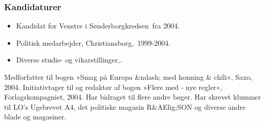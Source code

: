 \documentclass[11pt, a4paper]{awesome-cv}
\begin{document}
\begin{cvletter}
\subsubsection*{Kandidaturer}
\begin{itemize}
\item Kandidat for Venstre i Sønderborgkredsen fra 2004.
\end{itemize}
\begin{itemize}
\item Politisk medarbejder, Christiansborg, 1999-2004.
\item Diverse studie- og vikarstillinger,.
\end{itemize}
Medforfatter til bogen »Smag på Europa &ndash; med honning \& chili«, Saxo, 2004. Initiativtager til og redaktør af bogen »Flere med - nye regler«, Forlagskompagniet, 2004. Har bidraget til flere andre bøger. Har skrevet klummer til LO's Ugebrevet A4, det politiske magasin R&AElig;SON og diverse andre blade og magasiner.

\end{cvletter}
\end{document}
